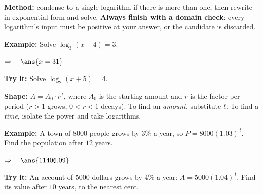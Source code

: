 \documentclass[12pt]{article}
\begin{document}

\begin{formulabox}
\textbf{Method:} condense to a single logarithm if there is more than one, then
rewrite in exponential form and solve. \textbf{Always finish with a domain
check}: every logarithm's input must be positive at your answer, or the candidate
is discarded.
\end{formulabox}

\begin{examplebox}
\textbf{Example:} \quad Solve $\log_3(x-4) = 3$.

$\Rightarrow\quad \ans{x = 31}$
\end{examplebox}

\begin{tryitbox}
\textbf{Try it:} \quad Solve $\log_2(x+5) = 4$.\\[2pt]
\end{tryitbox}


\begin{formulabox}
\textbf{Shape:} $A = A_0 \cdot r^{\,t}$, where $A_0$ is the starting amount and
$r$ is the factor per period ($r>1$ grows, $0<r<1$ decays). To find an
\emph{amount}, substitute $t$. To find a \emph{time}, isolate the power and take
logarithms.
\end{formulabox}

\begin{examplebox}
\textbf{Example:} \quad A town of $8000$ people grows by $3\%$ a year, so
$P = 8000(1.03)^{\,t}$. Find the population after $12$ years.

$\Rightarrow\quad \ans{11406.09}$
\end{examplebox}

\begin{tryitbox}
\textbf{Try it:} \quad An account of $5000$ dollars grows by $4\%$ a year:
$A = 5000(1.04)^{\,t}$. Find its value after $10$ years, to the nearest
cent.\\[2pt]
\end{tryitbox}
\end{document}
